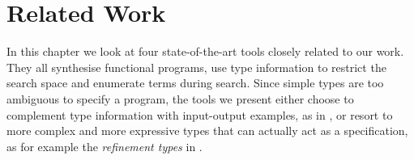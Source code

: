 \lstset{style=plain}

\chapter{Related Work} \label{ch:relatedwork}

In this chapter we look at four state-of-the-art tools closely related to our work. They all synthesise functional programs, use type information to restrict the search space and enumerate terms during search. Since simple types are too ambiguous to specify a program, the tools we present either choose to complement type information with input-output examples, as in \cite{LambdaSquarePaper, EscherPaper, MythPaper}, or resort to more complex and more expressive types that can actually act as a specification, as for example the \emph{refinement types} in \cite{SynquidPaper}.


\def\myraggedright{\rightskip0mm plus10mm\relax}

